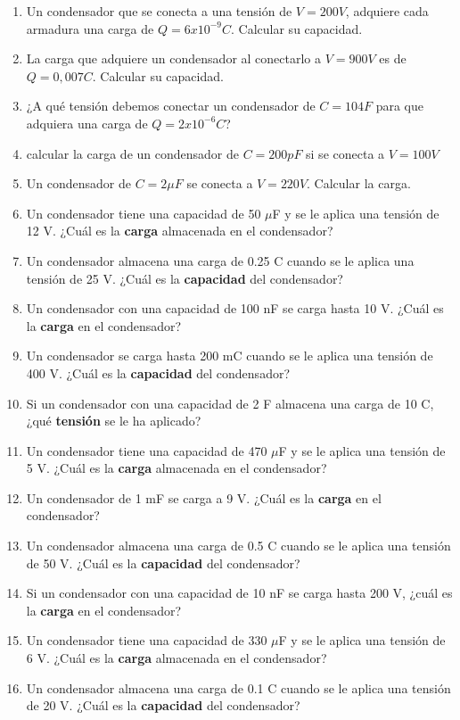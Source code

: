 \documentclass[../main]{subfiles}
\begin{document}
\begin{enumerate}
    \item Un condensador que se conecta a una tensión de $V=200V$, adquiere cada armadura una carga de $Q=6x10^{-9}C$. Calcular su capacidad.
    \item La carga que adquiere un condensador al conectarlo a $V=900V$ es de $Q=0,007C$. Calcular su capacidad.
    \item ¿A qué tensión debemos conectar un condensador de $C=104F$ para que adquiera una carga de $Q=2x10^{-6}C$?
    \item calcular la carga de un condensador de $C=200pF$ si se conecta a $V=100V$
    \item Un condensador de $C=2\mu F$ se conecta a $V=220V$. Calcular la carga. 
   \item Un condensador tiene una capacidad de 50 $\mu$F y se le aplica una tensión de 12 V. ¿Cuál es la \textbf{carga} almacenada en el condensador?
    \item Un condensador almacena una carga de 0.25 C cuando se le aplica una tensión de 25 V. ¿Cuál es la \textbf{capacidad} del condensador?
    \item Un condensador con una capacidad de 100 nF se carga hasta 10 V. ¿Cuál es la \textbf{carga} en el condensador?
    \item Un condensador se carga hasta 200 mC cuando se le aplica una tensión de 400 V. ¿Cuál es la \textbf{capacidad} del condensador?
    \item Si un condensador con una capacidad de 2 F almacena una carga de 10 C, ¿qué \textbf{tensión} se le ha aplicado?
    \item Un condensador tiene una capacidad de 470 $\mu$F y se le aplica una tensión de 5 V. ¿Cuál es la \textbf{carga} almacenada en el condensador?
    \item Un condensador de 1 mF se carga a 9 V. ¿Cuál es la \textbf{carga} en el condensador?
    \item Un condensador almacena una carga de 0.5 C cuando se le aplica una tensión de 50 V. ¿Cuál es la \textbf{capacidad} del condensador?
    \item Si un condensador con una capacidad de 10 nF se carga hasta 200 V, ¿cuál es la \textbf{carga} en el condensador?
    \item Un condensador tiene una capacidad de 330 $\mu$F y se le aplica una tensión de 6 V. ¿Cuál es la \textbf{carga} almacenada en el condensador?
    \item Un condensador almacena una carga de 0.1 C cuando se le aplica una tensión de 20 V. ¿Cuál es la \textbf{capacidad} del condensador?

\end{enumerate}
\end{document}
